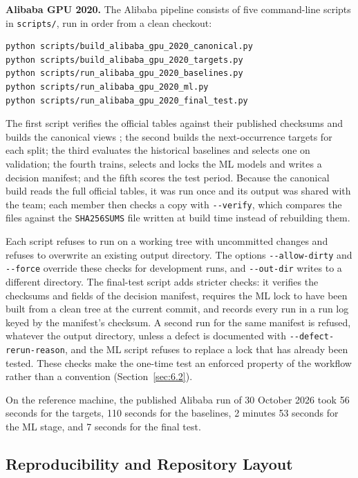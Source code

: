 \textbf{Alibaba GPU 2020.} The Alibaba pipeline consists of five command-line scripts in \texttt{scripts/}, run in order from a clean checkout:

{\footnotesize
\begin{verbatim}
python scripts/build_alibaba_gpu_2020_canonical.py
python scripts/build_alibaba_gpu_2020_targets.py
python scripts/run_alibaba_gpu_2020_baselines.py
python scripts/run_alibaba_gpu_2020_ml.py
python scripts/run_alibaba_gpu_2020_final_test.py
\end{verbatim}
}

The first script verifies the official tables against their published checksums and builds the canonical views \cite{ref19}; the second builds the next-occurrence targets for each split; the third evaluates the historical baselines and selects one on validation; the fourth trains, selects and locks the ML models and writes a decision manifest; and the fifth scores the test period. Because the canonical build reads the full official tables, it was run once and its output was shared with the team; each member then checks a copy with \texttt{-\/-verify}, which compares the files against the \texttt{SHA256SUMS} file written at build time instead of rebuilding them.

Each script refuses to run on a working tree with uncommitted changes and refuses to overwrite an existing output directory. The options \texttt{-\/-allow-dirty} and \texttt{-\/-force} override these checks for development runs, and \texttt{-\/-out-dir} writes to a different directory. The final-test script adds stricter checks: it verifies the checksums and fields of the decision manifest, requires the ML lock to have been built from a clean tree at the current commit, and records every run in a run log keyed by the manifest's checksum. A second run for the same manifest is refused, whatever the output directory, unless a defect is documented with \texttt{-\/-defect-rerun-reason}, and the ML script refuses to replace a lock that has already been tested. These checks make the one-time test an enforced property of the workflow rather than a convention (Section~\ref{sec:6.2}).

On the reference machine, the published Alibaba run of 30 October 2026 took 56 seconds for the targets, 110 seconds for the baselines, 2 minutes 53 seconds for the ML stage, and 7 seconds for the final test.

\subsection{Reproducibility and Repository Layout}\label{sec:8.2}

